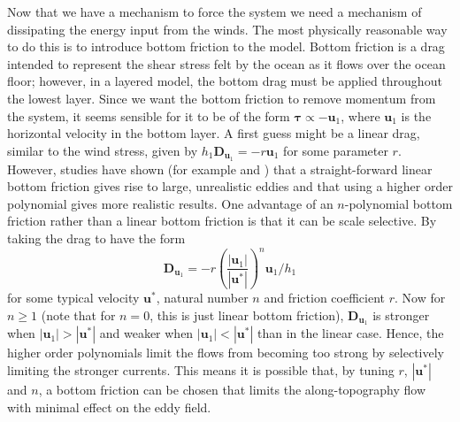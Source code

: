 \documentclass[12pt,a4paper]{report}
\begin{document}
  Now that we have a mechanism to force the system we need a 
  mechanism of dissipating the 
  energy input from the winds. The most physically reasonable way to do this is to
   introduce bottom friction to the model. Bottom friction is a drag intended to represent 
  the shear stress felt by the ocean as it flows over the ocean floor; however,
  in a layered model, the bottom drag must be applied throughout
  the lowest layer. Since we want the bottom friction to remove momentum
  from the system, it seems sensible for it to be of the form $\boldsymbol{\tau} \propto
  - \boldsymbol{u}_{1}$, where $\boldsymbol{u}_{1}$ is the horizontal velocity
  in the bottom layer. A first guess might be a linear drag, similar to the wind stress,
  given by  $h_{1}\boldsymbol{D}_{\boldsymbol{u}_{1}} = - r \boldsymbol{u}_{1}$ for
  some parameter $r$. However, studies have shown (for example \cite{grianik2004effects} and
  \cite{arbic2008quadratic})
  that a straight-forward linear
  bottom friction gives rise to large, unrealistic eddies and that using a higher order
  polynomial gives more realistic results.
  One advantage of an $n$-polynomial bottom  friction rather than 
  a linear bottom friction is that it can be scale selective. By taking the 
  drag to have the form 
  \begin{equation*}
  \boldsymbol{D}_{\boldsymbol{u}_{1}} = 
    - r \left( \frac{ \left|\boldsymbol{u}_{1}\right| }
    {\left|\boldsymbol{u}^{\ast}\right|}\right)^{n}
    \boldsymbol{u}_{1}/h_{1}
  \end{equation*} for some typical velocity $\boldsymbol{u}^{\ast}$, 
  natural number $n$ and friction coefficient $r$. Now for $n \geq 1$ (note that for $n=0$, this is 
  just linear bottom friction), $\boldsymbol{D}_{\boldsymbol{u}_{1}}$
  is stronger when $\left|\boldsymbol{u}_{1}\right| > \left|\boldsymbol{u}^{\ast}\right|$
  and weaker when $\left|\boldsymbol{u}_{1}\right| < \left|\boldsymbol{u}^{\ast}\right|$
  than in the linear case. Hence, the higher order polynomials limit the flows from 
  becoming too strong by selectively limiting the stronger currents.
  This means it is possible that, by tuning $r$, $\left|\boldsymbol{u}^{\ast}\right|$ and 
  $n$, a bottom friction can be chosen that limits the along-topography flow with
  minimal effect on the eddy field. 
  
\end{document}
